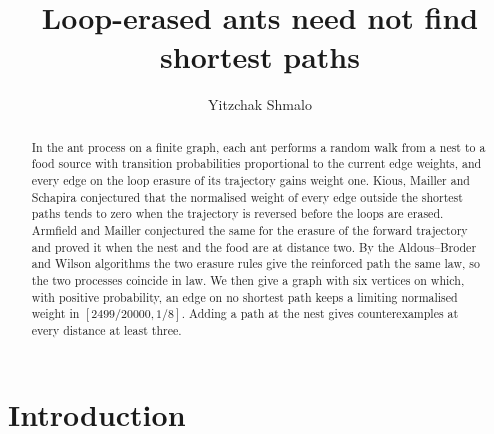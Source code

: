 \documentclass[11pt]{amsart}
\title[Loop-erased ants need not find shortest paths]{Loop-erased ants need not find shortest paths}
\author{Yitzchak Shmalo}
\theoremstyle{remark}
\begin{document}
\begin{abstract}
In the ant process on a finite graph, each ant performs a random walk from a nest to a food source with transition probabilities proportional to the current edge weights, and every edge on the loop erasure of its trajectory gains weight one. Kious, Mailler and Schapira conjectured that the normalised weight of every edge outside the shortest paths tends to zero when the trajectory is reversed before the loops are erased. Armfield and Mailler conjectured the same for the erasure of the forward trajectory and proved it when the nest and the food are at distance two. By the Aldous--Broder and Wilson algorithms the two erasure rules give the reinforced path the same law, so the two processes coincide in law. We then give a graph with six vertices on which, with positive probability, an edge on no shortest path keeps a limiting normalised weight in $[2499/20000,1/8]$. Adding a path at the nest gives counterexamples at every distance at least three.
\end{abstract}


\maketitle

\section{Introduction}
\end{document}
